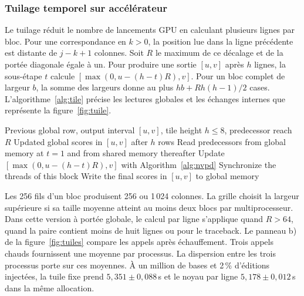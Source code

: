 \subsubsection{Tuilage temporel sur accélérateur}
Le tuilage réduit le nombre de lancements GPU en calculant plusieurs lignes par bloc. Pour une correspondance en \(k>0\), la position lue dans la ligne précédente est distante de \(j-k+1\) colonnes. Soit \(R\) le maximum de ce décalage et de la portée diagonale égale à un. Pour produire une sortie \([u,v]\) après \(h\) lignes, la sous-étape \(t\) calcule \([\max(0,u-(h-t)R),v]\). Pour un bloc complet de largeur \(b\), la somme des largeurs donne au plus \(hb+Rh(h-1)/2\) cases.
L'algorithme~\ref{alg:tile} précise les lectures globales et les échanges internes que représente la figure~\ref{fig:tuile}.
\begin{algorithm}[!htbp]
\caption{Avancement de plusieurs lignes dans un bloc CUDA}\label{alg:tile}
\begin{algorithmic}[1]
\Require Previous global row, output interval \([u,v]\), tile height \(h\le8\), predecessor reach \(R\)
\Ensure Updated global scores in \([u,v]\) after \(h\) rows
  \State Read predecessors from global memory at \(t=1\) and from shared memory thereafter
  \State Update \([\max(0,u-(h-t)R),v]\) with Algorithm~\ref{alg:nvpd}
  \State Synchronize the threads of this block
\EndFor
\State Write the final scores in \([u,v]\) to global memory
\end{algorithmic}
\end{algorithm}
Les 256 fils d'un bloc produisent 256 ou 1\,024 colonnes. La grille choisit la largeur supérieure si sa taille moyenne atteint au moins deux blocs par multiprocesseur. Dans cette version à portée globale, le calcul par ligne s’applique quand \(R>64\), quand la paire contient moins de huit lignes ou pour le traceback.
Le panneau b) de la figure~\ref{fig:tuiles} compare les appels après échauffement. Trois appels chauds fournissent une moyenne par processus. La dispersion entre les trois processus porte sur ces moyennes. À un million de bases et 2\,\% d’éditions injectées, la tuile fixe prend \(5{,}351\pm0{,}088\)\,s et le noyau par ligne \(5{,}178\pm0{,}012\)\,s dans la même allocation.

